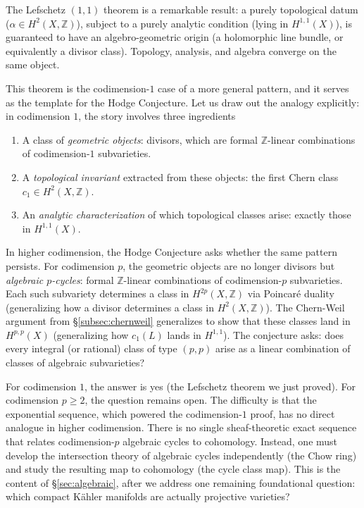 \documentclass{article}
\newcommand{\Z}{{\mathbb{Z}}}
\begin{document}
The Lefschetz $(1,1)$ theorem is a remarkable result: a purely topological
datum ($\alpha \in H^2(X, \Z)$), subject to a purely analytic condition (lying
in $H^{1,1}(X)$), is guaranteed to have an algebro-geometric origin (a
holomorphic line bundle, or equivalently a divisor class). Topology, analysis,
and algebra converge on the same object.

This theorem is the codimension-$1$ case of a more general pattern, and
it serves as the template for the Hodge Conjecture. Let us draw out the
analogy explicitly: in codimension $1$, the story involves three ingredients
\begin{enumerate}
  \item A class of \emph{geometric objects}: divisors, which are formal
    $\Z$-linear combinations of codimension-$1$ subvarieties.
  \item A \emph{topological invariant} extracted from these objects: the first
    Chern class $c_1 \in H^2(X, \Z)$.
  \item An \emph{analytic characterization} of which topological classes arise:
    exactly those in $H^{1,1}(X)$.
\end{enumerate}
In higher codimension, the Hodge Conjecture asks whether the same pattern
persists. For codimension $p$, the geometric objects are no longer divisors but
\emph{algebraic $p$-cycles}: formal $\Z$-linear combinations of codimension-$p$
subvarieties. Each such subvariety determines a class in $H^{2p}(X, \Z)$ via
Poincar\'{e} duality (generalizing how a divisor determines a class in
$H^2(X, \Z)$). The Chern-Weil argument from \S\ref{subsec:chernweil}
generalizes to show that these classes land in $H^{p,p}(X)$ (generalizing how
$c_1(L)$ lands in $H^{1,1}$). The conjecture asks: does every integral (or
rational) class of type $(p,p)$ arise as a linear combination of classes of
algebraic subvarieties?

For codimension $1$, the answer is yes (the Lefschetz theorem we just proved).
For codimension $p \geq 2$, the question remains open. The difficulty is
that the exponential sequence, which powered the codimension-$1$ proof, has no
direct analogue in higher codimension. There is no single sheaf-theoretic exact
sequence that relates codimension-$p$ algebraic cycles to cohomology. Instead,
one must develop the intersection theory of algebraic cycles independently
(the Chow ring) and study the resulting map to cohomology (the cycle class
map). This is the content of \S\ref{sec:algebraic}, after we address one
remaining foundational question: which compact K\"{a}hler manifolds are
actually projective varieties?
\end{document}
